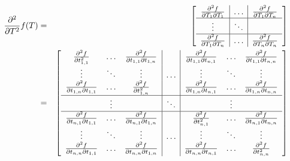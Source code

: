 \documentclass{report}
\begin{document}
\begin{eqnarray}
\frac{\partial^2}{\partial T^2} f(T) & = &
\left[ \begin{array}{c|c|c}
\frac{\partial^2 f}{\partial T_1 \partial T_1} &
\ldots &
\frac{\partial^2 f}{\partial T_1 \partial T_n} \\
\hline
\vdots & \ddots \\
\hline
\frac{\partial^2 f}{\partial T_1 \partial T_n} & 
\ldots & 
\frac{\partial^2 f}{\partial T_n \partial T_n} \\
\end{array} \right]
\\ & = &
\left[ \begin{array}{ccc|c|ccc}
\frac{\partial^2 f}{\partial t_{1,1}^2} &
\ldots &
\frac{\partial^2 f}{\partial t_{1,1} \partial t_{1,n}} &
&
\frac{\partial^2 f}{\partial t_{1,1} \partial t_{n,1}} &
\ldots &
\frac{\partial^2 f}{\partial t_{1,1} \partial t_{n,n}} \\
\vdots & \ddots & \vdots &
\ldots &
\vdots & \ddots & \vdots \\
\frac{\partial^2 f}{\partial t_{1,n} \partial t_{1,1}} &
\ldots &
\frac{\partial^2 f}{\partial t_{1,n}^2} &
&
\frac{\partial^2 f}{\partial t_{1,n} \partial t_{n,1}} &
\ldots &
\frac{\partial^2 f}{\partial t_{1,n} \partial t_{n,n}} \\
\hline
& \vdots & & \ddots & & \vdots \\
\hline
\frac{\partial^2 f}{\partial t_{n,1} \partial t_{1,1}} &
\ldots &
\frac{\partial^2 f}{\partial t_{n,1} \partial t_{1,n}} &
&
\frac{\partial^2 f}{\partial t_{n,1}^2} &
\ldots &
\frac{\partial^2 f}{\partial t_{n,1} \partial t_{n,n}} \\
\vdots & \ddots & \vdots &
\ldots &
\vdots & \ddots & \vdots \\
\frac{\partial^2 f}{\partial t_{n,n} \partial t_{1,1}} &
\ldots &
\frac{\partial^2 f}{\partial t_{n,n} \partial t_{1,n}} &
&
\frac{\partial^2 f}{\partial t_{n,n} \partial t_{n,1}} &
\ldots &
\frac{\partial^2 f}{\partial t_{n,n}^2} 
\end{array} \right] \nonumber \label{2nd-derv} \\
\end{eqnarray}
\end{document}
